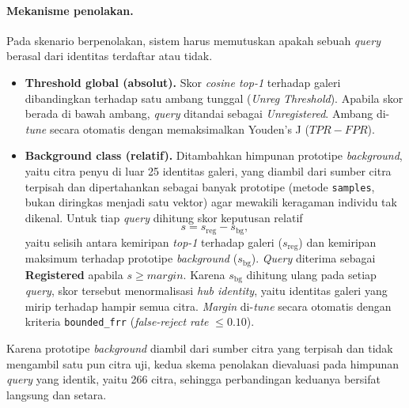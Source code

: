 \paragraph{Mekanisme penolakan.} Pada skenario berpenolakan, sistem harus memutuskan
apakah sebuah \textit{query} berasal dari identitas terdaftar atau tidak.
\begin{itemize}
    \item \textbf{Threshold global (absolut).} Skor \textit{cosine top-1} terhadap
          galeri dibandingkan terhadap satu ambang tunggal (\textit{Unreg Threshold}).
          Apabila skor berada di bawah ambang, \textit{query} ditandai sebagai
          \textit{Unregistered}. Ambang di-\textit{tune} secara otomatis dengan
          memaksimalkan Youden's J ($\mathit{TPR}-\mathit{FPR}$).
    \item \textbf{Background class (relatif).} Ditambahkan himpunan prototipe
          \textit{background}, yaitu citra penyu di luar 25 identitas galeri, yang
          diambil dari sumber citra terpisah dan dipertahankan sebagai banyak prototipe
          (metode \texttt{samples}, bukan diringkas menjadi satu vektor) agar mewakili
          keragaman individu tak dikenal. Untuk tiap \textit{query} dihitung skor
          keputusan relatif
          \[
              s = s_{\text{reg}} - s_{\text{bg}},
          \]
          yaitu selisih antara kemiripan \textit{top-1} terhadap galeri
          ($s_{\text{reg}}$) dan kemiripan maksimum terhadap prototipe \textit{background}
          ($s_{\text{bg}}$). \textit{Query} diterima sebagai \textbf{Registered} apabila
          $s \geq \textit{margin}$. Karena $s_{\text{bg}}$ dihitung ulang pada setiap
          \textit{query}, skor tersebut menormalisasi \textit{hub identity}, yaitu
          identitas galeri yang mirip terhadap hampir semua citra. \textit{Margin}
          di-\textit{tune} secara otomatis dengan kriteria \texttt{bounded\_frr}
          (\textit{false-reject rate} $\leq 0{.}10$).
\end{itemize}

Karena prototipe \textit{background} diambil dari sumber citra yang terpisah dan tidak
mengambil satu pun citra uji, kedua skema penolakan dievaluasi pada himpunan \textit{query}
yang identik, yaitu 266 citra, sehingga perbandingan keduanya bersifat langsung dan setara.

